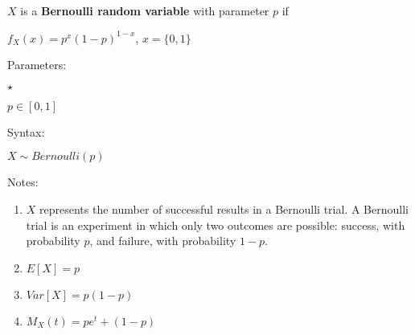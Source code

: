 \documentclass{article}
\begin{document}
$X$ is a \textbf{Bernoulli random variable} with parameter \textbf{$p$} if\\
\par
$f_X(x) = p^x (1-p)^{1-x}$,     $x=\{0,1\}$	\\
\par
Parameters:\\
\par
\begin{list}{$\star$ }{}
\item $p \in [0,1]$
\end{list}
\par
Syntax:\\
\par
$X\sim Bernoulli(p)$\\
\par
Notes:\\
\par
\begin{enumerate}

\item $X$ represents the number of successful results in a Bernoulli trial. A Bernoulli trial is an experiment in which only two outcomes are possible: success, with probability $p$, and failure, with probability $1-p$.
\item $E[X] = p$
\item $Var[X] = p(1-p)$
\item $M_X(t) = p e^t + (1-p)$

\end{enumerate}
\end{document}
